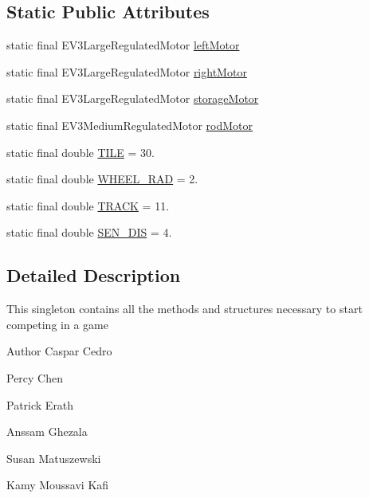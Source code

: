 \subsection*{Static Public Attributes}
\begin{DoxyCompactItemize}
\item 
static final E\+V3\+Large\+Regulated\+Motor \hyperlink{enumca_1_1mcgill_1_1ecse211_1_1project_1_1_game_a7c673571bf50fdb6917a9d7bb671e003}{left\+Motor}
\item 
static final E\+V3\+Large\+Regulated\+Motor \hyperlink{enumca_1_1mcgill_1_1ecse211_1_1project_1_1_game_a7a05fcf37c4435c32270776a427ba0d2}{right\+Motor}
\item 
static final E\+V3\+Large\+Regulated\+Motor \hyperlink{enumca_1_1mcgill_1_1ecse211_1_1project_1_1_game_af3ba5407b115e9c6e07dffda576f29b7}{storage\+Motor}
\item 
static final E\+V3\+Medium\+Regulated\+Motor \hyperlink{enumca_1_1mcgill_1_1ecse211_1_1project_1_1_game_aeb41e5234fcb3b311385f39a07a24a54}{rod\+Motor}
\item 
static final double \hyperlink{enumca_1_1mcgill_1_1ecse211_1_1project_1_1_game_a72c2224ad4dd557dde445ebc4baaf531}{T\+I\+LE} = 30.
\item 
static final double \hyperlink{enumca_1_1mcgill_1_1ecse211_1_1project_1_1_game_a91bd64670c2a91d006c907142783b1f8}{W\+H\+E\+E\+L\+\_\+\+R\+AD} = 2.
\item 
static final double \hyperlink{enumca_1_1mcgill_1_1ecse211_1_1project_1_1_game_a64cf12cdd6772ac1ce351ff1dfadd626}{T\+R\+A\+CK} = 11.
\item 
static final double \hyperlink{enumca_1_1mcgill_1_1ecse211_1_1project_1_1_game_ab940d1a52b9759294dc0229e0fd6bc06}{S\+E\+N\+\_\+\+D\+IS} = 4.
\end{DoxyCompactItemize}


\subsection{Detailed Description}
This singleton contains all the methods and structures necessary to start competing in a game

\begin{DoxyAuthor}{Author}
Caspar Cedro 

Percy Chen 

Patrick Erath 

Anssam Ghezala 

Susan Matuszewski 

Kamy Moussavi Kafi 
\end{DoxyAuthor}



